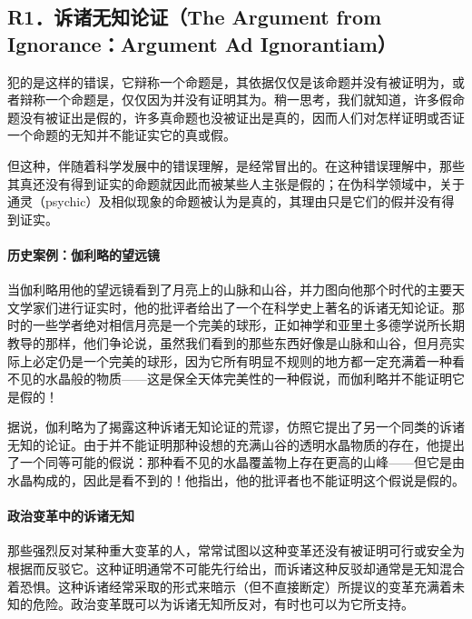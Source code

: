 \subsection{R1．诉诸无知论证（The Argument from Ignorance：Argument Ad Ignorantiam）}

\begin{theorembox}[title=诉诸无知论证的定义]
犯的是这样的错误，它辩称一个命题是，其依据仅仅是该命题并没有被证明为，或者辩称一个命题是，仅仅因为并没有证明其为。稍一思考，我们就知道，许多假命题没有被证出是假的，许多真命题也没被证出是真的，因而人们对怎样证明或否证一个命题的无知并不能证实它的真或假。
\end{theorembox}

但这种，伴随着科学发展中的错误理解，是经常冒出的。在这种错误理解中，那些其真还没有得到证实的命题就因此而被某些人主张是假的；在伪科学领域中，关于通灵（psychic）及相似现象的命题被认为是真的，其理由只是它们的假并没有得到证实。

\paragraph{历史案例：伽利略的望远镜}
当伽利略用他的望远镜看到了月亮上的山脉和山谷，并力图向他那个时代的主要天文学家们进行证实时，他的批评者给出了一个在科学史上著名的诉诸无知论证。那时的一些学者绝对相信月亮是一个完美的球形，正如神学和亚里土多德学说所长期教导的那样，他们争论说，虽然我们看到的那些东西好像是山脉和山谷，但月亮实际上必定仍是一个完美的球形，因为它所有明显不规则的地方都一定充满着一种看不见的水晶般的物质——这是保全天体完美性的一种假说，而伽利略并不能证明它是假的！

据说，伽利略为了揭露这种诉诸无知论证的荒谬，仿照它提出了另一个同类的诉诸无知的论证。由于并不能证明那种设想的充满山谷的透明水晶物质的存在，他提出了一个同等可能的假说：那种看不见的水晶覆盖物上存在更高的山峰——但它是由水晶构成的，因此是看不到的！他指出，他的批评者也不能证明这个假说是假的。

\paragraph{政治变革中的诉诸无知}
那些强烈反对某种重大变革的人，常常试图以这种变革还没有被证明可行或安全为根据而反驳它。这种证明通常不可能先行给出，而诉诸这种反驳却通常是无知混合着恐惧。这种诉诸经常采取的形式来暗示（但不直接断定）所提议的变革充满着未知的危险。政治变革既可以为诉诸无知所反对，有时也可以为它所支持。

